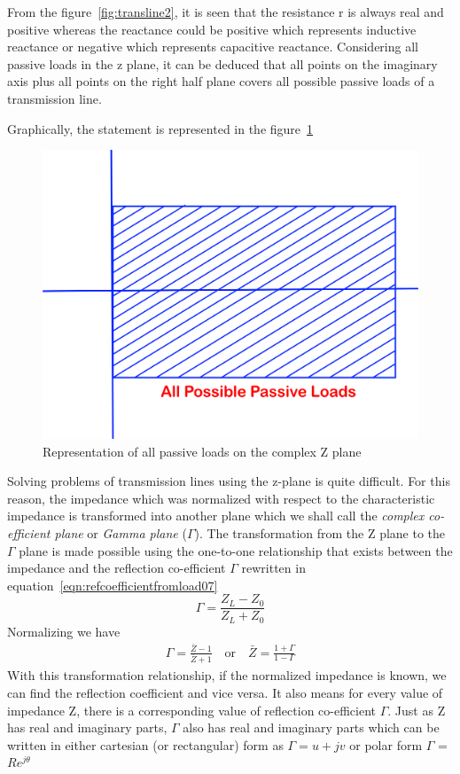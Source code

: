 From the figure~\ref{fig:transline2}, it is seen that the resistance r is always real and positive whereas the reactance could be positive which represents inductive reactance or negative which represents capacitive reactance. Considering all passive loads in the z plane, it can be deduced that all points on the imaginary axis plus all points on the right half plane covers all possible passive loads of a transmission line.

Graphically, the statement is represented in the figure~\ref{fig:oigvbnkliu}
\begin{figure}[h]
\centering
\includegraphics[width=0.6\linewidth]{./graphics/oigvbnkliu}
\caption{Representation of all passive loads on the complex Z plane}
\label{fig:oigvbnkliu}
\end{figure}

Solving problems of transmission lines using the z-plane is quite difficult. For this reason, the impedance which was normalized with respect to the characteristic impedance is transformed into another plane which we shall call the \emph{complex co-efficient plane} or \emph{Gamma plane} ($\Gamma$).
The transformation from the Z plane to the $\Gamma$ plane is made possible using the one-to-one relationship that exists between the impedance and the reflection co-efficient $\Gamma$ rewritten in equation~\eqref{eqn:refcoefficientfromload07}
\begin{equation}
\Gamma = \frac{Z_L - Z_0}{Z_L + Z_0}\label{eqn:refcoefficientfromload07}
\end{equation}
Normalizing we have
\begin{align*}
\Gamma= \frac{\bar{Z} - 1}{\bar{Z} + 1}\quad\text{or}\quad\bar{Z}= \frac{1 + \Gamma}{1 - \Gamma}
\end{align*}
With this transformation relationship, if the normalized impedance is known, we can find the reflection coefficient and vice versa. It also means for every value of impedance Z, there is a corresponding value of reflection co-efficient $ \Gamma$. Just as Z has real and imaginary parts, $\Gamma$ also has real and imaginary parts which can be written in either cartesian (or rectangular) form as $\Gamma=u+jv$ or polar form $\Gamma$ = $Re^{j\theta}$

